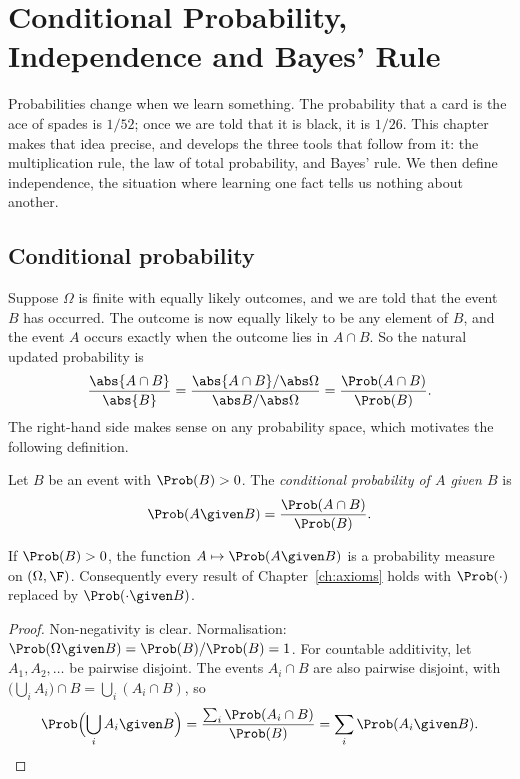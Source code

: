 \chapter{Conditional Probability, Independence and Bayes' Rule}
\label{ch:conditional}

Probabilities change when we learn something. The probability that a card is
the ace of spades is $1/52$; once we are told that it is black, it is $1/26$.
This chapter makes that idea precise, and develops the three tools that follow
from it: the multiplication rule, the law of total probability, and Bayes' rule.
We then define independence, the situation where learning one fact tells us
nothing about another.

\section{Conditional probability}

Suppose $\Omega$ is finite with equally likely outcomes, and we are told that
the event $B$ has occurred. The outcome is now equally likely to be any element
of $B$, and the event $A$ occurs exactly when the outcome lies in $A\cap B$. So
the natural updated probability is
\[
\frac{\abs{A\cap B}}{\abs{B}}=\frac{\abs{A\cap B}/\abs\Omega}{\abs B/\abs\Omega}
=\frac{\Prob(A\cap B)}{\Prob(B)}.
\]
The right-hand side makes sense on any probability space, which motivates the
following definition.

\begin{definition}
Let $B$ be an event with $\Prob(B)>0$. The \emph{conditional probability of $A$
given $B$} is
\[
\Prob(A\given B)=\frac{\Prob(A\cap B)}{\Prob(B)}.
\]
\end{definition}

\begin{theorem}\label{thm:condmeasure}
If $\Prob(B)>0$, the function $A\mapsto\Prob(A\given B)$ is a probability
measure on $(\Omega,\F)$. Consequently every result of Chapter~\ref{ch:axioms}
holds with $\Prob(\cdot)$ replaced by $\Prob(\cdot\given B)$.
\end{theorem}
\begin{proof}
Non-negativity is clear. Normalisation: $\Prob(\Omega\given B)=\Prob(B)/\Prob(B)=1$.
For countable additivity, let $A_1,A_2,\dots$ be pairwise disjoint. The events
$A_i\cap B$ are also pairwise disjoint, with
$\bigl(\bigcup_iA_i\bigr)\cap B=\bigcup_i(A_i\cap B)$, so
\[
\Prob\Bigl(\bigcup_iA_i\given B\Bigr)
=\frac{\sum_i\Prob(A_i\cap B)}{\Prob(B)}=\sum_i\Prob(A_i\given B).\qedhere
\]
\end{proof}

